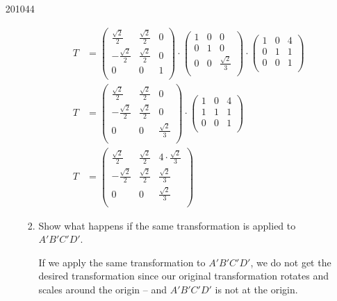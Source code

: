 \documentclass[10pt,\jkfside,a4paper]{article}
\begin{document}
\begin{enumerate}[label=(\alph*)]
\begin{examquestion}{2010}{4}{4}
\begin{enumerate}[label=(\alph*)]
\begin{enumerate}[label=(\roman*)]
\begin{equation}
\begin{split}
T &=
\begin{pmatrix}
\frac{\sqrt{2}}{2} & \frac{\sqrt{2}}{2} & 0\\
-\frac{\sqrt{2}}{2} & \frac{\sqrt{2}}{2} & 0\\
0 & 0 & 1\\
\end{pmatrix}
\cdot 
\begin{pmatrix}
1 & 0 & 0\\
0 & 1 & 0\\
0 & 0 & \frac{\sqrt{2}}{3}\\
\end{pmatrix}
\cdot
\begin{pmatrix}
1 & 0 & 4\\
0 & 1 & 1\\
0 & 0 & 1\\
\end{pmatrix}\\
T &= 
\begin{pmatrix}
\frac{\sqrt{2}}{2} & \frac{\sqrt{2}}{2} & 0\\
-\frac{\sqrt{2}}{2} & \frac{\sqrt{2}}{2} & 0\\
0 & 0 & \frac{\sqrt{2}}{3}\\
\end{pmatrix}
\cdot
\begin{pmatrix}
1 & 0 & 4\\
1 & 1 & 1\\
0 & 0 & 1\\
\end{pmatrix}\\
T &= 
\begin{pmatrix}
\frac{\sqrt{2}}{2} & \frac{\sqrt{2}}{2} & 4\cdot\frac{\sqrt{2}}{3}\\
-\frac{\sqrt{2}}{2} & \frac{\sqrt{2}}{2} & \frac{\sqrt{2}}{3}\\
0 & 0 & \frac{\sqrt{2}}{3}\\
\end{pmatrix}
\end{split}
\end{equation}

\item Show what happens if the same transformation is applied to $A'B'C'D'$.

If we apply the same transformation to $A'B'C'D'$, we do not get the desired 
transformation since our original transformation rotates and scales around the origin 
-- and $A'B'C'D'$ is not at the origin.


\end{enumerate}
\end{enumerate}
\end{examquestion}
\end{enumerate}
\end{document}
